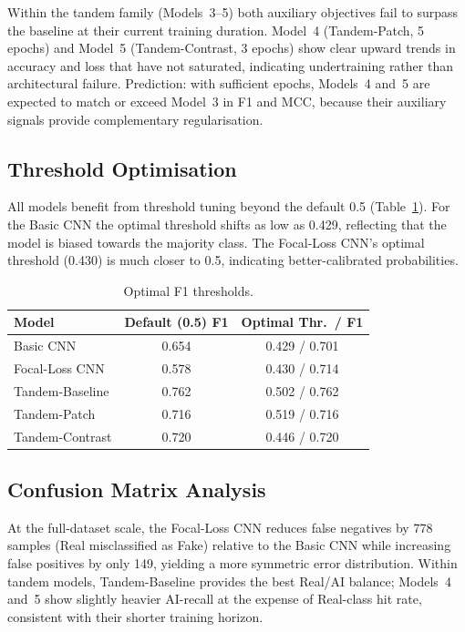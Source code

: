 \documentclass[10pt,twocolumn]{article}
\begin{document}
Within the tandem family (Models~3--5) both auxiliary objectives
fail to surpass the baseline at their current training duration.
Model~4 (Tandem-Patch, 5 epochs) and Model~5 (Tandem-Contrast,
3 epochs) show clear upward trends in accuracy and loss that have
not saturated, indicating undertraining rather than architectural
failure.
Prediction: with sufficient epochs, Models~4 and~5 are expected
to match or exceed Model~3 in F1 and MCC, because their auxiliary
signals provide complementary regularisation.

\subsection{Threshold Optimisation}

All models benefit from threshold tuning beyond the default 0.5
(Table~\ref{tab:thresholds}).
For the Basic CNN the optimal threshold shifts as low as 0.429,
reflecting that the model is biased towards the majority class.
The Focal-Loss CNN's optimal threshold (0.430) is much closer to
0.5, indicating better-calibrated probabilities.

\begin{table}[h]
\centering
\caption{Optimal F1 thresholds.}
\label{tab:thresholds}
\small
\begin{tabular}{lcc}
\toprule
\textbf{Model} & \textbf{Default (0.5) F1} & \textbf{Optimal Thr.\ / F1} \\
\midrule
Basic CNN       & 0.654 & 0.429 / 0.701 \\
Focal-Loss CNN  & 0.578 & 0.430 / 0.714 \\
Tandem-Baseline & 0.762 & 0.502 / 0.762 \\
Tandem-Patch    & 0.716 & 0.519 / 0.716 \\
Tandem-Contrast & 0.720 & 0.446 / 0.720 \\
\bottomrule
\end{tabular}
\end{table}

\subsection{Confusion Matrix Analysis}

At the full-dataset scale, the Focal-Loss CNN reduces false negatives
by 778 samples (Real misclassified as Fake) relative to the Basic CNN
while increasing false positives by only 149, yielding a more symmetric
error distribution.
Within tandem models, Tandem-Baseline provides the best Real/AI balance;
Models~4 and~5 show slightly heavier AI-recall at the expense of
Real-class hit rate, consistent with their shorter training horizon.
\end{document}
